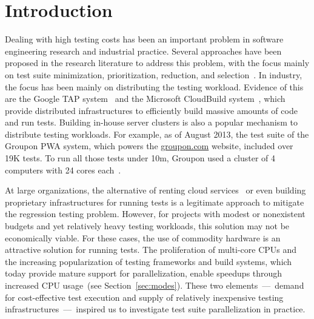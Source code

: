 \section{Introduction}
\label{sec:intro}



Dealing with high testing costs has been an important problem in
software engineering research and industrial practice.  Several
approaches have been proposed in the research literature to address
this problem, with the focus mainly on test suite minimization,
prioritization, reduction, and selection~\cite{yoo-harman-stvr2012}.
In industry, the focus has been mainly on distributing the testing
workload.  Evidence of this are the Google TAP
system~\cite{google-tap,google-ci} and the Microsoft CloudBuild
system~\cite{prasad-shulte-ieee-microsoft-ci}, which provide
distributed infrastructures to efficiently build massive amounts of
code and run tests.  Building in-house server clusters is also a
popular mechanism to distribute testing workloads.  For example, as of
August 2013, the test suite of the Groupon PWA system, which powers
the \url{groupon.com} website, included over 19K tests.  To run all
those tests under 10m, Groupon used a cluster of 4 computers with 24
cores each~\cite{kim-etal-fse2013}.

At large organizations, the alternative of renting cloud
services~\cite{cloud-services} or even building proprietary
infrastructures for running tests is a legitimate approach to mitigate
the regression testing problem.  However, for projects with modest
 or nonexistent budgets and yet relatively heavy testing workloads, this solution may
not be economically viable.  For these cases, the use of commodity
hardware is an attractive
solution for running tests.  The proliferation of
multi-core CPUs and the increasing popularization of testing
frameworks and build systems, which today provide mature support for
parallelization, enable speedups through increased CPU
usage~(see Section~\ref{sec:modes}).  These two elements~---~demand
for cost-effective test execution and supply of relatively inexpensive
testing infrastructures~---~inspired us to investigate 
test suite parallelization in practice.

